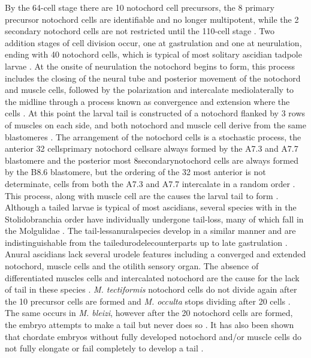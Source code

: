 By the 64-cell stage there are 10 notochord cell precursors, the 8 primary precursor notochord cells are identifiable and no longer multipotent, while the 2 secondary notochord cells are not restricted until the 110-cell stage \cite{nishida_cell_1985,yasuo_ascidian_1994,yasuo_conservation_1998,lemaire_unfolding_2009}. Two addition stages of cell division occur, one at gastrulation and one at neurulation, ending with 40 notochord cells, which is typical of most solitary ascidian tadpole larvae \cite{conklin_organization_1905}. At the onsite of neurulation the notochord begins to form, this process includes the closing of the neural tube and posterior movement of the notochord and muscle cells, followed by the polarization and intercalate mediolaterally to the midline through a process known as convergence and extension where the cells \cite{swalla_mechanisms_1993}. At this point the larval tail is constructed of a notochord flanked by 3 rows of muscles on each side, and both notochord and muscle cell derive from the same blastomeres \cite{nishida_cell_1985}. The arrangement of the notochord cells is a stochastic process, the anterior 32 cells\textemdash primary notochord cells\textemdash are always formed by the A7.3 and A7.7 blastomere and the posterior most 8\textemdash secondary\textemdash notochord cells are always formed by the B8.6 blastomere, but the ordering of the 32 most anterior is not determinate, cells from both the A7.3 and A7.7 intercalate in a random order \cite{nishida_cell_1983,nishida_cell_1985,miyamoto_formation_1985, swalla_mechanisms_1993,kourakis_one-dimensional_2014}. This process, along with muscle cell are the causes the larval tail to form \cite{miyamoto_formation_1985, jeffery_factors_1992,swalla_mechanisms_1993}.
Although a tailed larvae is typical of most ascidians, several species with in the Stolidobranchia order have individually undergone tail-loss, many of which fall in the Molgulidae \cite{berrill_studies_1931, jeffery_evolution_1999, huber_evolution_2000, maliska_molgula_2010}. The tail-less\textemdash anural\textemdash species develop in a similar manner and are indistinguishable from the tailed\textemdash urodele\textemdash counterparts up to late gastrulation \cite{berrill_studies_1931, swalla_interspecific_1990, jeffery_factors_1992}. Anural ascidians lack several urodele features including a converged and extended notochord, muscle cells and the otilith sensory organ. The absence of differentiated muscles cells and intercalated notochord are the cause for the lack of tail in these species \cite{miyamoto_formation_1985, swalla_interspecific_1990}. \textit{M. tectiformis} notochord cells do not divide again after the 10 precursor cells are formed and \textit{M. occulta} stops dividing after 20 cells \cite{jeffery_evolution_1999}. The same occurs in \textit{M. bleizi}, however after the 20 notochord cells are formed, the embryo attempts to make a tail but never does so \cite{swalla_novel_1993}. It has also been shown that chordate embryos without fully developed notochord and/or muscle cells do not fully elongate or fail completely to develop a tail \cite{jeffery_evolution_1999,takada_brachyury_2002,stemple_structure_2005}. 
